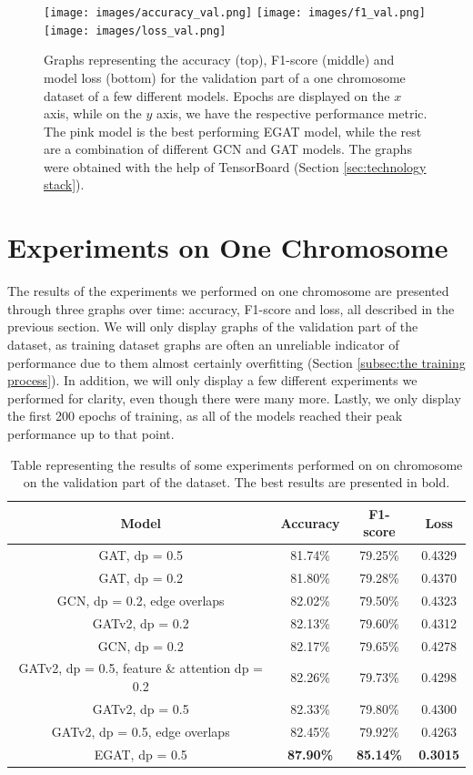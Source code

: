 \documentclass[times, utf8, diplomski, english]{fer_eng}
\begin{document}
\begin{figure}[h]
	\centering
	\texttt{[image: images/accuracy\_val.png]}
	\texttt{[image: images/f1\_val.png]}
	\texttt{[image: images/loss\_val.png]}
	\caption[Accuracy, f1-score and loss graph for one chromosome]{Graphs representing the accuracy (top), F1-score (middle) and model loss (bottom) for the validation part of a one chromosome dataset of a few different models. Epochs are displayed on the $x$ axis, while on the $y$ axis, we have the respective performance metric. The pink model is the best performing EGAT model, while the rest are a combination of different GCN and GAT models. The graphs were obtained with the help of TensorBoard (Section \ref{sec:technology stack}).}
	\label{fig:accuracy and f1 graph}
\end{figure}

\section{Experiments on One Chromosome}
\label{sec:experiments on one chromosome}

The results of the experiments we performed on one chromosome are presented through three graphs over time: accuracy, F1-score and loss, all described in the previous section. We will only display graphs of the validation part of the dataset, as training dataset graphs are often an unreliable indicator of performance due to them almost certainly overfitting (Section \ref{subsec:the training process}). In addition, we will only display a few different experiments we performed for clarity, even though there were many more. Lastly, we only display the first 200 epochs of training, as all of the models reached their peak performance up to that point.

\begin{table}
	\centering
	\begin{tabular}{ |c|c|c|c| }
		\hline	
		Model & Accuracy & F1-score & Loss \\
		\hline\hline
		GAT, dp = 0.5 & 81.74\% & 79.25\% & 0.4329 \\
		\hline
		GAT, dp = 0.2 & 81.80\% & 79.28\% & 0.4370 \\
		\hline
		GCN, dp = 0.2, edge overlaps & 82.02\% & 79.50\% & 0.4323 \\
		\hline
		GATv2, dp = 0.2 & 82.13\% & 79.60\% & 0.4312 \\
		\hline
		GCN, dp = 0.2 & 82.17\% & 79.65\% & 0.4278 \\
		\hline
		GATv2, dp = 0.5, feature \& attention dp = 0.2 & 82.26\% & 79.73\% & 0.4298 \\
		\hline
		GATv2, dp = 0.5 & 82.33\% & 79.80\% & 0.4300 \\
		\hline
		GATv2, dp = 0.5, edge overlaps & 82.45\% & 79.92\% & 0.4263 \\
		\hline
		EGAT, dp = 0.5 & \textbf{87.90\%} & \textbf{85.14\%} & \textbf{0.3015} \\
		\hline
	\end{tabular}
	\caption{Table representing the results of some experiments performed on on chromosome on the validation part of the dataset. The best results are presented in bold.}
	\label{tab:results}
\end{table}	
\end{document}
